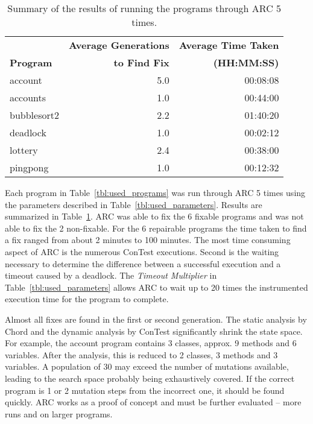 \documentclass[runningheads,a4paper]{llncs}
\begin{document}
\begin{table}[t!]
\caption{Summary of the results of running the programs through ARC 5 times.}
\begin{center}
\lstset{basicstyle=\scriptsize}
\begin{tabular}{|p{3.5cm}|r|r|}
\hline
 & 
\textbf{Average Generations} & 
\textbf{Average Time Taken} 
\\
\textbf{Program} & 
\textbf{to Find Fix} & 
\textbf{(HH:MM:SS)} 
\\\hline

account & 5.0 & 00:08:08
\\\hline
accounts & 1.0 & 00:44:00
\\\hline
bubblesort2 & 2.2 & 01:40:20
\\\hline
deadlock & 1.0 & 00:02:12
\\\hline
lottery & 2.4 & 00:38:00
\\\hline
pingpong & 1.0 & 00:12:32
\\\hline

\end{tabular}
\label{tbl:summary_results}
\end{center}
\end{table}

Each program in Table~\ref{tbl:used_programs} was run through ARC 5 times using the parameters described in Table~\ref{tbl:used_parameters}. Results are summarized in Table~\ref{tbl:summary_results}. ARC was able to fix the 6 fixable programs and was not able to fix the 2 non-fixable. For the 6 repairable programs the time taken to find a fix ranged from about 2 minutes to 100 minutes. The most time consuming aspect of ARC is the numerous ConTest executions. Second is the waiting necessary to determine the difference between a successful execution and a timeout caused by a deadlock. The \textit{Timeout Multiplier} in Table~\ref{tbl:used_parameters} allows ARC to wait up to 20 times the instrumented execution time for the program to complete.

Almost all fixes are found in the first or second generation.  The static analysis by Chord and the dynamic analysis by ConTest significantly shrink the state space.  For example, the account program contains 3 classes, approx. 9 methods and 6 variables.  After the analysis, this is reduced to 2 classes, 3 methods and 3 variables.  A population of 30 may exceed the number of mutations available, leading to the search space probably being exhaustively covered.  If the correct program is 1 or 2 mutation steps from the incorrect one, it should be found quickly.  ARC works as a proof of concept and must be further evaluated -- more runs and on larger programs.
\end{document}
